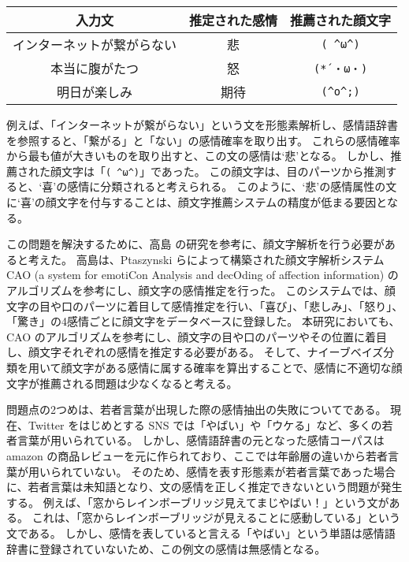 \documentclass[11pt,a4j]{jsarticle}
\begin{document}
\begin{table}[htb]
  \centering
  \begin{tabular}{c||c|c} \hline
    入力文 & 推定された感情 & 推薦された顔文字 \\ \hline
    インターネットが繋がらない & 悲 & \verb|( ^ω^)| \\
    本当に腹がたつ & 怒 & \verb|(*´・ω・)|   \\
    明日が楽しみ & 期待 & \verb|(^o^;)| \\ \hline
  \end{tabular}
\end{table}

例えば、「インターネットが繋がらない」という文を形態素解析し、感情語辞書を参照すると、「繋がる」と「ない」の感情確率を取り出す。
これらの感情確率から最も値が大きいものを取り出すと、この文の感情は`悲'となる。
しかし、推薦された顔文字は「\verb|( ^ω^)|」であった。
この顔文字は、目のパーツから推測すると、`喜'の感情に分類されると考えられる。
このように、`悲'の感情属性の文に`喜'の顔文字を付与することは、顔文字推薦システムの精度が低まる要因となる。

この問題を解決するために、高島  の研究を参考に、顔文字解析を行う必要があると考えた。
高島は、Ptaszynski らによって構築された顔文字解析システム CAO (a system for emotiCon Analysis and decOding of affection information) のアルゴリズムを参考にし、顔文字の感情推定を行った。
このシステムでは、顔文字の目や口のパーツに着目して感情推定を行い、「喜び」、「悲しみ」、「怒り」、「驚き」の4感情ごとに顔文字をデータベースに登録した。
本研究においても、CAO のアルゴリズムを参考にし、顔文字の目や口のパーツやその位置に着目し、顔文字それぞれの感情を推定する必要がある。
そして、ナイーブベイズ分類を用いて顔文字がある感情に属する確率を算出することで、感情に不適切な顔文字が推薦される問題は少なくなると考える。


問題点の2つめは、若者言葉が出現した際の感情抽出の失敗についてである。
現在、Twitter をはじめとする SNS では「やばい」や「ウケる」など、多くの若者言葉が用いられている。
しかし、感情語辞書の元となった感情コーパスは amazon の商品レビューを元に作られており、ここでは年齢層の違いから若者言葉が用いられていない。
そのため、感情を表す形態素が若者言葉であった場合に、若者言葉は未知語となり、文の感情を正しく推定できないという問題が発生する。
例えば、「窓からレインボーブリッジ見えてまじやばい！」という文がある。
これは、「窓からレインボーブリッジが見えることに感動している」という文である。
しかし、感情を表していると言える「やばい」という単語は感情語辞書に登録されていないため、この例文の感情は無感情となる。
\end{document}
